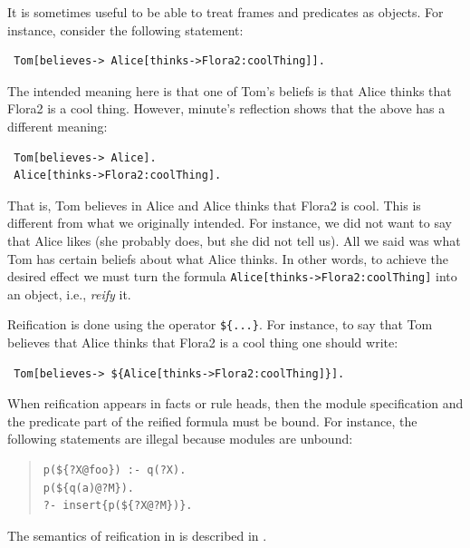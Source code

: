 \documentclass[11pt]{article}
\newcommand{\ERGO}{\mbox{\smaller{\ensuremath{\cal{E}}\smaller{{\sc{RGO}}}}}\xspace}
\newcommand{\FLSYSTEM}{\ERGO}
\begin{document}
It is sometimes useful to be able to treat \FLSYSTEM frames and predicates
as objects. For instance, consider the following statement:
\begin{verbatim}
 Tom[believes-> Alice[thinks->Flora2:coolThing]].
\end{verbatim}
The intended meaning here is that one of Tom's beliefs is that Alice
thinks that Flora2 is a cool thing. However, minute's reflection shows
that the above has a different meaning:
\begin{verbatim}
 Tom[believes-> Alice].
 Alice[thinks->Flora2:coolThing].  
\end{verbatim}
That is, Tom believes in Alice and Alice thinks that Flora2 is
cool. This is different from what we originally intended. For instance, we
did not want to say that Alice likes \FLSYSTEM (she probably does, but she did
not tell us). All we said was what Tom has certain beliefs about what Alice
thinks. In other words, to achieve the desired effect we must turn the
formula {\tt Alice[thinks->Flora2:coolThing]} into an object,
i.e., \emph{reify} it.

Reification is done using the operator {\tt \$\{...\}}. For instance, to
say that Tom believes that Alice thinks that Flora2 is a
cool thing one should write:
\begin{verbatim}
 Tom[believes-> ${Alice[thinks->Flora2:coolThing]}].
\end{verbatim}

When reification appears in facts or rule heads, then the module
specification and the predicate part of the reified formula must be bound.
For instance, the following statements are illegal because modules are
unbound:
\begin{quote}
\begin{verbatim}
p(${?X@foo}) :- q(?X).
p(${q(a)@?M}).
?- insert{p(${?X@?M})}. 
\end{verbatim}
\end{quote}

\noindent
The semantics of reification in \FLSYSTEM is described in
\cite{reification-data-semantics-03}.
\end{document}
